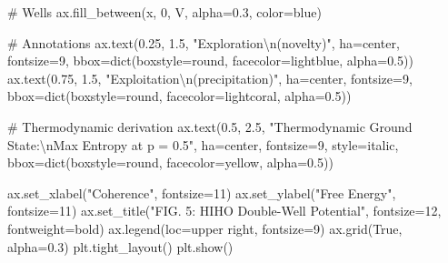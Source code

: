 \documentclass[
  letterpaper,
  DIV=11,
  numbers=noendperiod]{scrartcl}
\newenvironment{Shaded}{\begin{snugshade}}{\end{snugshade}}
\newcommand{\BuiltInTok}[1]{\textcolor[rgb]{0.00,0.23,0.31}{#1}}
\newcommand{\CharTok}[1]{\textcolor[rgb]{0.13,0.47,0.30}{#1}}
\newcommand{\CommentTok}[1]{\textcolor[rgb]{0.37,0.37,0.37}{#1}}
\newcommand{\DecValTok}[1]{\textcolor[rgb]{0.68,0.00,0.00}{#1}}
\newcommand{\FloatTok}[1]{\textcolor[rgb]{0.68,0.00,0.00}{#1}}
\newcommand{\NormalTok}[1]{\textcolor[rgb]{0.00,0.23,0.31}{#1}}
\newcommand{\OperatorTok}[1]{\textcolor[rgb]{0.37,0.37,0.37}{#1}}
\newcommand{\StringTok}[1]{\textcolor[rgb]{0.13,0.47,0.30}{#1}}
\newcommand{\VariableTok}[1]{\textcolor[rgb]{0.07,0.07,0.07}{#1}}
\begin{document}
\begin{Shaded}
\begin{Highlighting}[]
\CommentTok{\# Wells}
\NormalTok{ax.fill\_between(x, }\DecValTok{0}\NormalTok{, V, alpha}\OperatorTok{=}\FloatTok{0.3}\NormalTok{, color}\OperatorTok{=}\StringTok{\textquotesingle{}blue\textquotesingle{}}\NormalTok{)}

\CommentTok{\# Annotations}
\NormalTok{ax.text(}\FloatTok{0.25}\NormalTok{, }\FloatTok{1.5}\NormalTok{, }\StringTok{"Exploration}\CharTok{\textbackslash{}n}\StringTok{(novelty)"}\NormalTok{, ha}\OperatorTok{=}\StringTok{\textquotesingle{}center\textquotesingle{}}\NormalTok{, fontsize}\OperatorTok{=}\DecValTok{9}\NormalTok{, }
\NormalTok{        bbox}\OperatorTok{=}\BuiltInTok{dict}\NormalTok{(boxstyle}\OperatorTok{=}\StringTok{\textquotesingle{}round\textquotesingle{}}\NormalTok{, facecolor}\OperatorTok{=}\StringTok{\textquotesingle{}lightblue\textquotesingle{}}\NormalTok{, alpha}\OperatorTok{=}\FloatTok{0.5}\NormalTok{))}
\NormalTok{ax.text(}\FloatTok{0.75}\NormalTok{, }\FloatTok{1.5}\NormalTok{, }\StringTok{"Exploitation}\CharTok{\textbackslash{}n}\StringTok{(precipitation)"}\NormalTok{, ha}\OperatorTok{=}\StringTok{\textquotesingle{}center\textquotesingle{}}\NormalTok{, fontsize}\OperatorTok{=}\DecValTok{9}\NormalTok{,}
\NormalTok{        bbox}\OperatorTok{=}\BuiltInTok{dict}\NormalTok{(boxstyle}\OperatorTok{=}\StringTok{\textquotesingle{}round\textquotesingle{}}\NormalTok{, facecolor}\OperatorTok{=}\StringTok{\textquotesingle{}lightcoral\textquotesingle{}}\NormalTok{, alpha}\OperatorTok{=}\FloatTok{0.5}\NormalTok{))}

\CommentTok{\# Thermodynamic derivation}
\NormalTok{ax.text(}\FloatTok{0.5}\NormalTok{, }\FloatTok{2.5}\NormalTok{, }\StringTok{"Thermodynamic Ground State:}\CharTok{\textbackslash{}n}\StringTok{Max Entropy at p = 0.5"}\NormalTok{, }
\NormalTok{        ha}\OperatorTok{=}\StringTok{\textquotesingle{}center\textquotesingle{}}\NormalTok{, fontsize}\OperatorTok{=}\DecValTok{9}\NormalTok{, style}\OperatorTok{=}\StringTok{\textquotesingle{}italic\textquotesingle{}}\NormalTok{,}
\NormalTok{        bbox}\OperatorTok{=}\BuiltInTok{dict}\NormalTok{(boxstyle}\OperatorTok{=}\StringTok{\textquotesingle{}round\textquotesingle{}}\NormalTok{, facecolor}\OperatorTok{=}\StringTok{\textquotesingle{}yellow\textquotesingle{}}\NormalTok{, alpha}\OperatorTok{=}\FloatTok{0.5}\NormalTok{))}

\NormalTok{ax.set\_xlabel(}\StringTok{"Coherence"}\NormalTok{, fontsize}\OperatorTok{=}\DecValTok{11}\NormalTok{)}
\NormalTok{ax.set\_ylabel(}\StringTok{"Free Energy"}\NormalTok{, fontsize}\OperatorTok{=}\DecValTok{11}\NormalTok{)}
\NormalTok{ax.set\_title(}\StringTok{"FIG. 5: HIHO Double{-}Well Potential"}\NormalTok{, fontsize}\OperatorTok{=}\DecValTok{12}\NormalTok{, fontweight}\OperatorTok{=}\StringTok{\textquotesingle{}bold\textquotesingle{}}\NormalTok{)}
\NormalTok{ax.legend(loc}\OperatorTok{=}\StringTok{\textquotesingle{}upper right\textquotesingle{}}\NormalTok{, fontsize}\OperatorTok{=}\DecValTok{9}\NormalTok{)}
\NormalTok{ax.grid(}\VariableTok{True}\NormalTok{, alpha}\OperatorTok{=}\FloatTok{0.3}\NormalTok{)}
\NormalTok{plt.tight\_layout()}
\NormalTok{plt.show()}
\end{Highlighting}
\end{Shaded}
\end{document}
